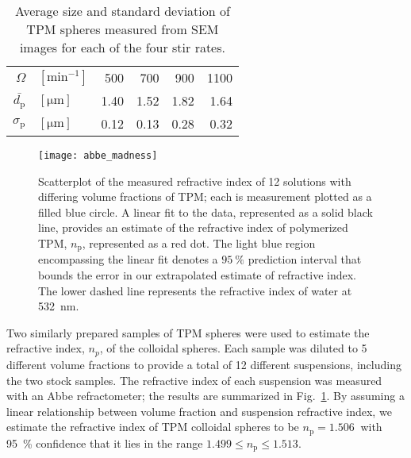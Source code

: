 \begin{table}[b!]
\centering
\caption{Average size and standard deviation of TPM spheres measured from
SEM images for each of the four stir rates.}
\begin{tabular}{rlrrrr}
\hline
\hline
 $\Omega$ & $[\si{\minute^{-1}}]$ & \num{500} & \num{700}& \num{900} & \num{1100} \\
$\bar{d_{\text{p}}}$ & $[\si{\um}]$ & 1.40 & 1.52 & 1.82 & 1.64 \\ 
$\sigma_{\text{p}}$ & $[\si{\um}]$ & 0.12 & 0.13 & 0.28 & 0.32 \\ \hline \hline
\end{tabular}
\label{table:sem_data}
\end{table}


\begin{figure}
    \centering
    \texttt{[image: abbe\_madness]}
    \caption{Scatterplot of the measured refractive index of \num{12} solutions
      with differing volume fractions of TPM; each is measurement plotted as a filled
      blue circle.
      A linear fit to the data, represented as a solid black line, provides an estimate of
      the refractive index of polymerized TPM, $n_{\text{p}}$, represented as a red dot.
      The light blue region encompassing the linear fit denotes a $\SI{95}{\percent}$
      prediction interval that bounds the error in our extrapolated estimate of refractive
      index.
      The lower dashed line represents the refractive index of water at \SI{532}{\nm}.}
    \label{fig:abbe}
\end{figure}

Two similarly prepared samples of TPM spheres were used to estimate the refractive
index, $n_p$, of the colloidal spheres.
Each sample was diluted to \num{5} different volume fractions to provide a total of
\num{12} different suspensions, including the two stock samples. The refractive index of each
suspension was measured with an Abbe refractometer;
the results are summarized in Fig.~\ref{fig:abbe}.
By assuming a linear relationship between volume fraction and suspension refractive
index, we estimate the refractive index of TPM colloidal spheres to be $n_{\text{p}} = \SI{1.506}{}$ with \SI{95}{\percent} confidence that it lies in the range $1.499 \le n_{\text{p}} \le 1.513$.

